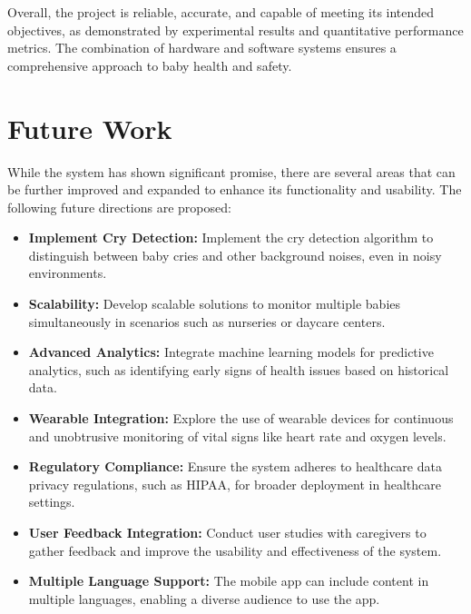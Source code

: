 \documentclass[12pt,a4paper]{report}
\begin{document}
Overall, the project is reliable, accurate, and capable of meeting its intended objectives, as demonstrated by experimental results and quantitative performance metrics. The combination of hardware and software systems ensures a comprehensive approach to baby health and safety.

\section{Future Work}
While the system has shown significant promise, there are several areas that can be further improved and expanded to enhance its functionality and usability. The following future directions are proposed:
\begin{itemize}
    \item \textbf{Implement Cry Detection:} Implement the cry detection algorithm to distinguish between baby cries and other background noises, even in noisy environments.
    \item \textbf{Scalability:} Develop scalable solutions to monitor multiple babies simultaneously in scenarios such as nurseries or daycare centers.
    \item \textbf{Advanced Analytics:} Integrate machine learning models for predictive analytics, such as identifying early signs of health issues based on historical data.
    \item \textbf{Wearable Integration:} Explore the use of wearable devices for continuous and unobtrusive monitoring of vital signs like heart rate and oxygen levels.
    \item \textbf{Regulatory Compliance:} Ensure the system adheres to healthcare data privacy regulations, such as HIPAA, for broader deployment in healthcare settings.
    \item \textbf{User Feedback Integration:} Conduct user studies with caregivers to gather feedback and improve the usability and effectiveness of the system.
    \item \textbf{Multiple Language Support:} The mobile app can include content in multiple languages, enabling a diverse audience to use the app.
\end{itemize}
\end{document}
